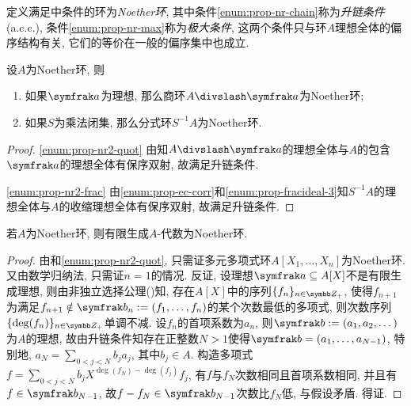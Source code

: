 定义满足中条件的环为\emph{Noether环}, 其中条件\ref{enum:prop-nr-chain}称为\emph{升链条件}(a.c.c.), 条件\ref{enum:prop-nr-max}称为\emph{极大条件}, 这两个条件只与环$A$理想全体的偏序结构有关, 它们的等价在一般的偏序集中也成立.

\begin{proposition}\label{prop:noetherring2}
    设$A$为Noether环, 则
    \begin{enumerate}
        \item\label{enum:prop-nr2-quot} 如果$\ideal{a}$为理想, 那么商环$A{\divslash}\ideal{a}$为Noether环;
        \item\label{enum:prop-nr2-frac} 如果$S$为乘法闭集, 那么分式环$S^{-1}A$为Noether环.
    \end{enumerate}
\end{proposition}

\begin{proof}
    \ref{enum:prop-nr2-quot} 由知$A{\divslash}\ideal{a}$的理想全体与$A$的包含$\ideal{a}$的理想全体有保序双射, 故满足升链条件.

    \ref{enum:prop-nr2-frac} 由\ref{enum:prop-ec-corr}和\ref{enum:prop-fracideal-3}知$S^{-1}A$的理想全体与$A$的收缩理想全体有保序双射, 故满足升链条件.
\end{proof}

\begin{theorem}
    若$A$为Noether环, 则有限生成$A$-代数为Noether环.
\end{theorem}

\begin{proof}
    由和\ref{enum:prop-nr2-quot}, 只需证多元多项式环$A[X_1, \dotsc, X_n]$为Noether环. 又由数学归纳法, 只需证$n=1$的情况. 反证, 设理想$\ideal{a}\subseteq A[X]$不是有限生成理想, 则由非独立选择公理()知, 存在$A[X]$中的序列$\{f_n\}_{n\in\ZZ_+}$, 使得$f_{n+1}$为满足$f_{n+1}\notin \ideal{b}_n:=(f_1, \dotsc, f_{n})$的某个次数最低的多项式, 则次数序列$\{\deg(f_n)\}_{n\in\ZZ_+}$单调不减. 设$f_n$的首项系数为$a_n$, 则$\ideal{b}:=(a_1, a_2, \dotsc)$为$A$的理想, 故由升链条件知存在正整数$N>1$使得$\ideal{b}=(a_1, \dotsc, a_{N-1})$, 特别地, $a_N=\sum_{0<j<N}b_ja_j$, 其中$b_j\in A$. 构造多项式$f=\sum_{0<j<N}b_jX^{\deg(f_N)-\deg(f_j)}f_j$, 有$f$与$f_N$次数相同且首项系数相同, 并且有$f\in\ideal{b}_{N-1}$, 故$f-f_N\in\ideal{b}_{N-1}$次数比$f_N$低, 与假设矛盾. 得证.
\end{proof}


